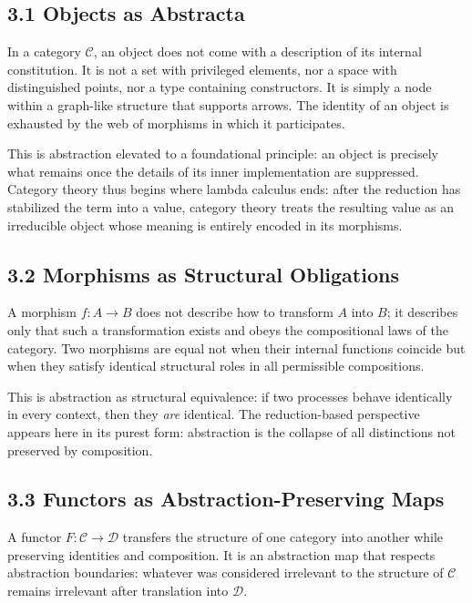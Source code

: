 \documentclass[12pt,letterpaper]{article}
\begin{document}
\subsection{3.1 Objects as Abstracta}

In a category \(\mathcal{C}\), an object does not come with a description of its internal constitution. It is not a set with privileged elements, nor a space with distinguished points, nor a type containing constructors. It is simply a node within a graph-like structure that supports arrows. The identity of an object is exhausted by the web of morphisms in which it participates.

This is abstraction elevated to a foundational principle: an object is precisely what remains once the details of its inner implementation are suppressed. Category theory thus begins where lambda calculus ends: after the reduction has stabilized the term into a value, category theory treats the resulting value as an irreducible object whose meaning is entirely encoded in its morphisms.

\subsection{3.2 Morphisms as Structural Obligations}

A morphism \(f : A \to B\) does not describe how to transform \(A\) into \(B\); it describes only that such a transformation exists and obeys the compositional laws of the category. Two morphisms are equal not when their internal functions coincide but when they satisfy identical structural roles in all permissible compositions.

This is abstraction as structural equivalence: if two processes behave identically in every context, then they \emph{are} identical. The reduction-based perspective appears here in its purest form: abstraction is the collapse of all distinctions not preserved by composition.

\subsection{3.3 Functors as Abstraction-Preserving Maps}

A functor \(F : \mathcal{C} \to \mathcal{D}\) transfers the structure of one category into another while preserving identities and composition. It is an abstraction map that respects abstraction boundaries: whatever was considered irrelevant to the structure of \(\mathcal{C}\) remains irrelevant after translation into \(\mathcal{D}\).
\end{document}
